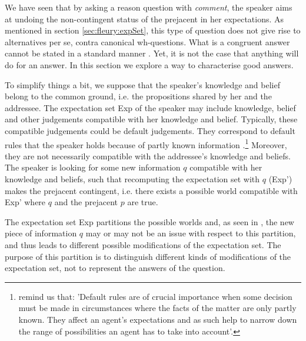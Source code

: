 \documentclass[output=paper,colorlinks,citecolor=brown,
]{langscibook}
\begin{document}
We have seen that by asking a reason question with \textit{comment}, the speaker aims at
undoing the non-contingent status of the prejacent
in her expectations. 
As mentioned in section 
\ref{sec:fleury:expSet}, this type of question  does not give rise to alternatives per se, contra canonical wh-questions.
What is a congruent answer cannot be stated in a standard manner
\citep{Stechow91}.
Yet, it is not the case that anything will do for an answer. In this section we explore a way to characterise good answers.

To simplify things a bit, we suppose that the speaker's knowledge and belief belong to the common ground, i.e. the propositions shared by her and the addressee.
The expectation set Exp of the speaker may include 
knowledge, belief and other judgements compatible with her knowledge and belief. Typically, these compatible judgements could be default judgements.  
They correspond to default rules that the speaker holds because of partly known information
\citep{Veltman96,CrespoKarawaniVeltman18}.\footnote{\citet[269]{CrespoKarawaniVeltman18} remind us that: 'Default rules are of crucial importance when some decision must be made in circumstances where the facts of the matter are only partly known. They affect an agent's expectations and as such help to narrow down the range of possibilities an agent has to take into account'.}
%
Moreover, they are not necessarily compatible with the addressee's knowledge and beliefs.
The speaker is looking for some new information $q$
compatible with her knowledge and beliefs,
such that  recomputing the expectation set with $q$ (Exp') makes the prejacent contingent, i.e. there exists a possible world compatible with Exp' where $q$ and the prejacent $p$ are true.



The expectation set Exp
partitions the possible worlds and, as seen in , the new piece of information $q$ may or may not be an issue with respect to this partition, and thus leads to different possible modifications of the expectation set. The purpose of this partition is to distinguish
different kinds of modifications of the expectation set, not to represent the answers of the question.
\end{document}
